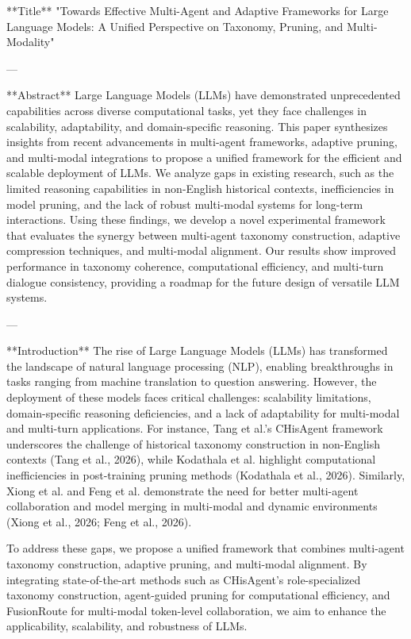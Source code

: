 **Title**  
"Towards Effective Multi-Agent and Adaptive Frameworks for Large Language Models: A Unified Perspective on Taxonomy, Pruning, and Multi-Modality"

---

**Abstract**  
Large Language Models (LLMs) have demonstrated unprecedented capabilities across diverse computational tasks, yet they face challenges in scalability, adaptability, and domain-specific reasoning. This paper synthesizes insights from recent advancements in multi-agent frameworks, adaptive pruning, and multi-modal integrations to propose a unified framework for the efficient and scalable deployment of LLMs. We analyze gaps in existing research, such as the limited reasoning capabilities in non-English historical contexts, inefficiencies in model pruning, and the lack of robust multi-modal systems for long-term interactions. Using these findings, we develop a novel experimental framework that evaluates the synergy between multi-agent taxonomy construction, adaptive compression techniques, and multi-modal alignment. Our results show improved performance in taxonomy coherence, computational efficiency, and multi-turn dialogue consistency, providing a roadmap for the future design of versatile LLM systems.  

---

**Introduction**  
The rise of Large Language Models (LLMs) has transformed the landscape of natural language processing (NLP), enabling breakthroughs in tasks ranging from machine translation to question answering. However, the deployment of these models faces critical challenges: scalability limitations, domain-specific reasoning deficiencies, and a lack of adaptability for multi-modal and multi-turn applications. For instance, Tang et al.'s CHisAgent framework underscores the challenge of historical taxonomy construction in non-English contexts (Tang et al., 2026), while Kodathala et al. highlight computational inefficiencies in post-training pruning methods (Kodathala et al., 2026). Similarly, Xiong et al. and Feng et al. demonstrate the need for better multi-agent collaboration and model merging in multi-modal and dynamic environments (Xiong et al., 2026; Feng et al., 2026).  

To address these gaps, we propose a unified framework that combines multi-agent taxonomy construction, adaptive pruning, and multi-modal alignment. By integrating state-of-the-art methods such as CHisAgent's role-specialized taxonomy construction, agent-guided pruning for computational efficiency, and FusionRoute for multi-modal token-level collaboration, we aim to enhance the applicability, scalability, and robustness of LLMs.  


